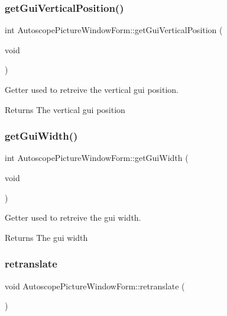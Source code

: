 \subsubsection{\texorpdfstring{getGuiVerticalPosition()}{getGuiVerticalPosition()}}
{\footnotesize\ttfamily int Autoscope\+Picture\+Window\+Form\+::get\+Gui\+Vertical\+Position (\begin{DoxyParamCaption}\item[{void}]{ }\end{DoxyParamCaption})}



Getter used to retreive the vertical gui position. 

\begin{DoxyReturn}{Returns}
The vertical gui position 
\end{DoxyReturn}
\mbox{\label{class_autoscope_picture_window_form_a7e8d04d5bf4eafc415a9d6176a2325e9}} 
\subsubsection{\texorpdfstring{getGuiWidth()}{getGuiWidth()}}
{\footnotesize\ttfamily int Autoscope\+Picture\+Window\+Form\+::get\+Gui\+Width (\begin{DoxyParamCaption}\item[{void}]{ }\end{DoxyParamCaption})}



Getter used to retreive the gui width. 

\begin{DoxyReturn}{Returns}
The gui width 
\end{DoxyReturn}
\mbox{\label{class_autoscope_picture_window_form_a4bcc43707d7b76b19d81ffc66a4b7ee2}} 
\subsubsection{\texorpdfstring{retranslate}{retranslate}}
{\footnotesize\ttfamily void Autoscope\+Picture\+Window\+Form\+::retranslate (\begin{DoxyParamCaption}{ }\end{DoxyParamCaption})\hspace{0.3cm}{\ttfamily [slot]}}



